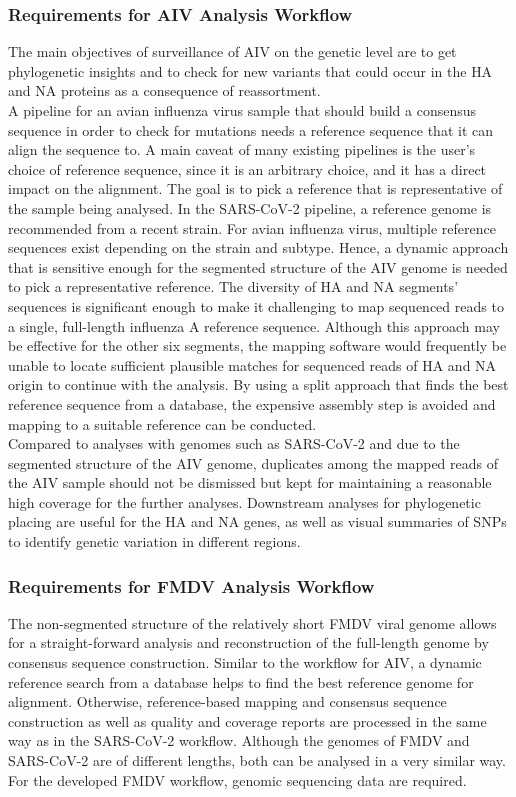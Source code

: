 \subsubsection{Requirements for AIV Analysis Workflow}
The main objectives of surveillance of \ac{AIV} on the genetic level are to get phylogenetic insights and to check for new variants that could occur in the \ac{HA} and \ac{NA} proteins as a consequence of reassortment. \\
A pipeline for an avian influenza virus sample that should build a consensus sequence in order to check for mutations needs a reference sequence that it can align the sequence to. A main caveat of many existing pipelines is the user's choice of reference sequence, since it is an arbitrary choice, and it has a direct impact on the alignment. The goal is to pick a reference that is representative of the sample being analysed. In the \ac{SARS-CoV-2} pipeline, a reference genome is recommended from a recent strain. For avian influenza virus, multiple reference sequences exist depending on the strain and subtype. Hence, a dynamic approach that is sensitive enough for the segmented structure of the \ac{AIV} genome is needed to pick a representative reference. The diversity of \ac{HA} and \ac{NA} segments' sequences is significant enough to make it challenging to map sequenced reads to a single, full-length influenza A reference sequence. Although this approach may be effective for the other six segments, the mapping software would frequently be unable to locate sufficient plausible matches for sequenced reads of \ac{HA} and \ac{NA} origin to continue with the analysis. By using a split approach that finds the best reference sequence from a database, the expensive assembly step is avoided and mapping to a suitable reference can be conducted. \\
Compared to analyses with genomes such as \ac{SARS-CoV-2} and due to the segmented structure of the \ac{AIV} genome, duplicates among the mapped reads of the \ac{AIV} sample should not be dismissed but kept for maintaining a reasonable high coverage for the further analyses. Downstream analyses for phylogenetic placing are useful for the \ac{HA} and \ac{NA} genes, as well as visual summaries of \acp{SNP} to identify genetic variation in different regions.

\subsubsection{Requirements for FMDV Analysis Workflow}
The non-segmented structure of the relatively short \ac{FMDV} viral genome allows for a straight-forward analysis and reconstruction of the full-length genome by consensus sequence construction. Similar to the workflow for \ac{AIV}, a dynamic reference search from a database helps to find the best reference genome for alignment. Otherwise, reference-based mapping and consensus sequence construction as well as quality and coverage reports are processed in the same way as in the \ac{SARS-CoV-2} workflow. Although the genomes of \ac{FMDV} and \ac{SARS-CoV-2} are of different lengths, both can be analysed in a very similar way. For the developed \ac{FMDV} workflow, genomic sequencing data are required.

